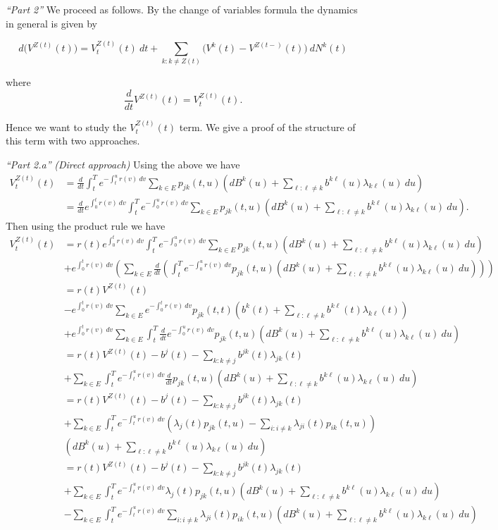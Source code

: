 \documentclass[a4paper,10pt,openany]{book}
\begin{document}
\emph{``Part 2''} We proceed as follows. By the change of variables formula the dynamics in general is given by

\[
d\Big(V^{Z(t)}(t)\Big)=V_t^{Z(t)}(t)\ dt+\sum_{k: k\ne Z(t)}\Big(V^k(t)-V^{Z(t-)}(t)\Big)\ dN^k(t)
\]

where
\[
\frac{d}{dt}V^{Z(t)}(t)=V_t^{Z(t)}(t).
\]

Hence we want to study the \(V_t^{Z(t)}(t)\) term. We give a proof of the structure of this term with two approaches.

\emph{``Part 2.a''} \emph{(Direct approach)} Using the above we have
\begin{align*}
V_t^{Z(t)}(t)&=\frac{d}{dt}\int_t^Te^{-\int_t^ur(v)\ dv}\sum_{k\in E}p_{jk}(t,u)\left(d B^k(u)+\sum_{\ell :\ell \ne k}  b^{k\ell }(u)\lambda_{k\ell }(u)\ du\right)\\
&=\frac{d}{dt}e^{\int_0^tr(v)\ dv}\int_t^Te^{-\int_0^ur(v)\ dv}\sum_{k\in E}p_{jk}(t,u)\left(d B^k(u)+\sum_{\ell :\ell \ne k}  b^{k\ell }(u)\lambda_{k\ell }(u)\ du\right).
\end{align*}
Then using the product rule we have
\begin{align*}
V_t^{Z(t)}(t)&=r(t)e^{\int_0^tr(v)\ dv}\int_t^Te^{-\int_0^ur(v)\ dv}\sum_{k\in E}p_{jk}(t,u)\left(d B^k(u)+\sum_{\ell :\ell \ne k}  b^{k\ell }(u)\lambda_{k\ell }(u)\ du\right)\\
&+e^{\int_0^tr(v)\ dv}\left(\sum_{k\in E}\frac{d}{dt}\left(\int_t^Te^{-\int_0^ur(v)\ dv}p_{jk}(t,u)\left(d B^k(u)+\sum_{\ell :\ell \ne k}  b^{k\ell }(u)\lambda_{k\ell }(u)\ du\right)\right)\right)\\
&=r(t)V^{Z(t)}(t)\\
&-e^{\int_0^tr(v)\ dv}\sum_{k\in E}e^{-\int_0^tr(v)\ dv}p_{jk}(t,t)\left(b^k(t)+\sum_{\ell :\ell \ne k}  b^{k\ell }(t)\lambda_{k\ell }(t)\right)\\
&+e^{\int_0^tr(v)\ dv}\sum_{k\in E}\int_t^T\frac{d}{dt}e^{-\int_0^ur(v)\ dv}p_{jk}(t,u)\left(d B^k(u)+\sum_{\ell :\ell \ne k}  b^{k\ell }(u)\lambda_{k\ell }(u)\ du\right)\\
&=r(t)V^{Z(t)}(t)-b^j(t)-\sum_{k :k \ne j}  b^{jk}(t)\lambda_{jk }(t)\\
&+\sum_{k\in E}\int_t^Te^{-\int_t^ur(v)\ dv}\frac{d}{dt}p_{jk}(t,u)\left(d B^k(u)+\sum_{\ell :\ell \ne k}  b^{k\ell }(u)\lambda_{k\ell }(u)\ du\right)\\
&=r(t)V^{Z(t)}(t)-b^j(t)-\sum_{k :k \ne j}  b^{jk}(t)\lambda_{jk }(t)\\
&+\sum_{k\in E}\int_t^Te^{-\int_t^ur(v)\ dv}\left(\lambda_j(t)p_{jk}(t,u)-\sum_{i:i\ne k}\lambda_{ji}(t)p_{ik}(t,u)\right)\\
&\left(d B^k(u)+\sum_{\ell :\ell \ne k}  b^{k\ell }(u)\lambda_{k\ell }(u)\ du\right)\\
&=r(t)V^{Z(t)}(t)-b^j(t)-\sum_{k :k \ne j}  b^{jk}(t)\lambda_{jk }(t)\\
&+\sum_{k\in E}\int_t^Te^{-\int_t^ur(v)\ dv}\lambda_j(t)p_{jk}(t,u)\left(d B^k(u)+\sum_{\ell :\ell \ne k}  b^{k\ell }(u)\lambda_{k\ell }(u)\ du\right)\\
&-\sum_{k\in E}\int_t^Te^{-\int_t^ur(v)\ dv}\sum_{i:i\ne k}\lambda_{ji}(t)p_{ik}(t,u)\left(d B^k(u)+\sum_{\ell :\ell \ne k}  b^{k\ell }(u)\lambda_{k\ell }(u)\ du\right)
\end{align*}
\end{document}
